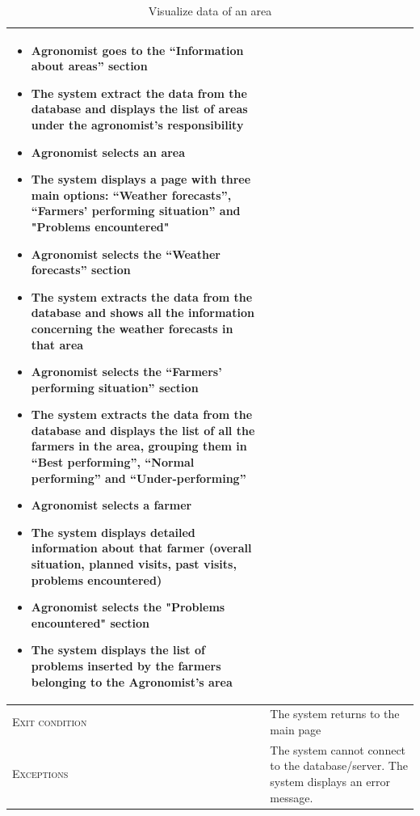\begin{table}[H]
\begin{tabular}[c]{|l|p{}|}
\begin{itemize}
                                    	    \item Agronomist goes to the “Information about areas” section
                                    	    \item The system extract the data from the database and displays the list of areas under the agronomist's responsibility
                                    	    \item Agronomist selects an area
                                    		\item The system displays a page with three main options: “Weather forecasts”, “Farmers’ performing situation” and "Problems encountered"
                                    		\item Agronomist selects  the “Weather forecasts” section
                                    		\item The system extracts the data from the database and shows all the information concerning the weather forecasts in that area
                                    		\item Agronomist selects the “Farmers’ performing situation” section
                                    		\item The system extracts the data from the database and displays the list of all the farmers in the area, grouping them in “Best performing”, “Normal performing” and “Under-performing”
                                    		\item Agronomist selects a farmer
                                    		\item The system displays detailed information about that farmer (overall situation, planned visits, past visits, problems encountered)
                                    		\item Agronomist selects the "Problems encountered" section
                                    		\item The system displays the list of problems inserted by the farmers belonging to the Agronomist's area
                                        \end{itemize}\\
        \hline %
        \textsc{Exit condition}    &  The system returns to the main page\\
    	\hline %
    	\textsc{Exceptions}         &  The system cannot connect to the database/server. The system displays an error message.
    	\\
    	\hline %
        
    \end{tabular}
    \caption{\label{tab:Area_information_access}Visualize data of an area}
\end{table}

